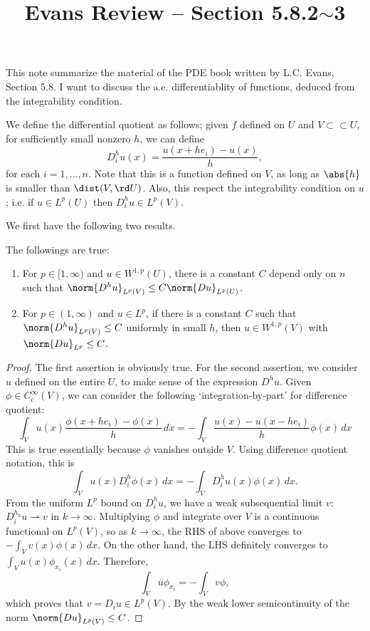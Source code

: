 \documentclass[a4paper]{amsart}
\title{Evans Review -- Section 5.8.2\(\sim\)3}
\begin{document}
\maketitle

This note summarize the material of the PDE book written by L.C. Evans, Section 5.8. 
I want to discuss the a.e. differentiablity of functions, deduced from the integrability condition. 

We define the differential quotient as follows; given \(f\) defined on \(U\) and \(V\subset\subset U\), for sufficiently small nonzero \(h\), we can define 
\[
    D_i^h u(x) = \frac{u(x + he_i)-u(x)}{h},
\]
for each \(i = 1, \ldots, n\). 
Note that this is a function defined on \(V\), as long as \(\abs{h}\) is smaller than \(\dist(V, \rd U)\). 
Also, this respect the integrability condition on \(u\); i.e. if \(u \in L^p(U)\) then \(D_i^h u\in L^p(V)\). 

We first have the following two results.
\begin{prop*} The followings are true: 
    \begin{enumerate}
        \item For \(p\in [1, \infty)\) and \(u\in W^{1, p}(U)\), there is a constant \(C\) depend only on \(n\) such that \(\norm{D^h u}_{L^p(V)}\le C \norm{D u}_{L^p(U)}\).
        \item For \(p\in (1, \infty)\) and \(u\in L^p\), if there is a constant \(C\) such that \(\norm{D^h u}_{L^p(V)}\le C\) uniformly in small \(h\), then \(u\in W^{1, p}(V)\) with \(\norm{Du}_{L^p}\le C\).
    \end{enumerate}
\end{prop*}
\begin{proof}
    The first assertion is obviously true. For the second assertion, we consider \(u\) defined on the entire \(U\), to make sense of the expression \(D^h u\).
    Given \(\phi\in C_c^\infty(V)\), we can consider the following `integration-by-part' for difference quotient: 
    \[
        \int_V u(x)\frac{\phi(x+he_i)-\phi(x)}{h} \,dx 
        = -\int_V \frac{u(x)-u(x-he_i)}{h}\phi(x) \,dx 
    \]
    This is true essentially because \(\phi\) vanishes outside \(V\).
    Using difference quotient notation, this is 
    \[
        \int_V u(x)D_i^h \phi(x) \,dx = -\int_V D_i^h u(x)\phi(x) \,dx.
    \]
    From the uniform \(L^p\) bound on \(D_i^h u\), we have a weak subsequential limit \(v\): \(D_i^{h_k} u\rightharpoonup v\) in \(k\to \infty\). 
    Multiplying \(\phi\) and integrate over \(V\) is a continuous functional on \(L^p(V)\), so as \(k\to \infty\), the RHS of above converges to \(-\int_V v(x)\phi(x)\,dx\). 
    On the other hand, the LHS definitely converges to \(\int_V u(x) \phi_{x_i}(x) \,dx\). Therefore, 
    \[
        \int_V u\phi_{x_i} = -\int_V v\phi,
    \]
    which proves that \(v = D_i u \in L^p(V)\). 
    By the weak lower semicontinuity of the norm \(\norm{Du}_{L^p(V)}\le C\).
\end{proof}
\end{document}
